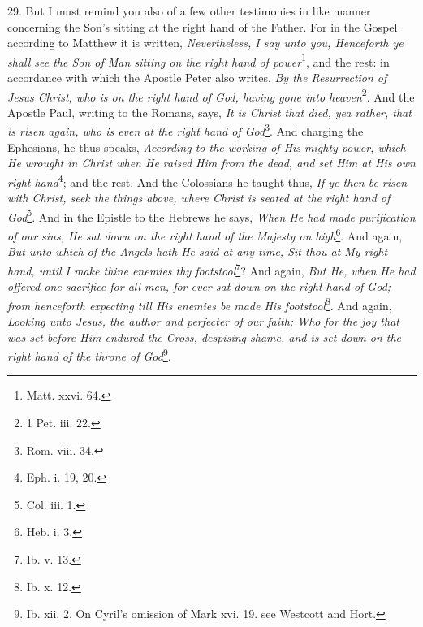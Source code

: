 29. But I must remind you also of a few other testimonies in like manner concerning the Son’s sitting at the right hand of the Father. For in the Gospel according to Matthew it is written, \emph{Nevertheless, I say unto you, Henceforth ye shall see the Son of Man sitting on the right hand of power}\footnote{Matt. xxvi. 64.}, and the rest: in accordance with which the Apostle Peter also writes, \emph{By the Resurrection of Jesus Christ, who is on the right hand of God, having gone into heaven}\footnote{1 Pet. iii. 22.}. And the Apostle Paul, writing to the Romans, says, \emph{It is Christ that died, yea rather, that is risen again, who is even at the right hand of God}\footnote{Rom. viii. 34.}. And charging the Ephesians, he thus speaks, \emph{According to the working of His mighty power, which He wrought in Christ when He raised Him from the dead, and set Him at His own right hand}\footnote{Eph. i. 19, 20.}; and the rest. And the Colossians he taught thus, \emph{If ye then be risen with Christ, seek the things above, where Christ is seated at the right hand of God}\footnote{Col. iii. 1.}. And in the Epistle to the Hebrews he says, \emph{When He had made purification of our sins, He sat down on the right hand of the Majesty on high}\footnote{Heb. i. 3.}. And again, \emph{But unto which of the Angels hath He said at any time, Sit thou at My right hand, until I make thine enemies thy footstool}\footnote{Ib. v. 13.}? And again, \emph{But He, when He had offered one sacrifice for all men, for ever sat down on the right hand of God; from henceforth expecting till His enemies be made His footstool}\footnote{Ib. x. 12.}. And again, \emph{Looking unto Jesus, the author and perfecter of our faith; Who for the joy that was set before Him endured the Cross, despising shame, and is set down on the right hand of the throne of God}\footnote{Ib. xii. 2. On Cyril’s omission of Mark xvi. 19. see Westcott and Hort.}.

